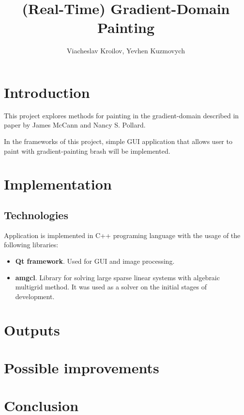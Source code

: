 \documentclass[hidelinks, english]{report}
\title{(Real-Time) Gradient-Domain Painting}
\author{Viacheslav Kroilov, Yevhen Kuzmovych}
\affiliation{ČVUT - FIT}
\begin{document}
\maketitle

\section{Introduction}

This project explores methods for painting in the gradient-domain described in paper by James McCann and
Nancy S. Pollard\cite{gradient}.

In the frameworks of this project, simple GUI application that allows user to paint with gradient-painting brash will
be implemented.

\section{Implementation}

\subsection{Technologies}

Application is implemented in C++ programing language with the usage of the following libraries:

\begin{itemize}
    \item \textbf{Qt framework}. Used for GUI and image processing.
    \item \textbf{amgcl}. Library for solving large sparse linear systems with algebraic multigrid method. It was used
    as a solver on the initial stages of development.
\end{itemize}


\section{Outputs}


\section{Possible improvements}


\section{Conclusion}



\end{document}
